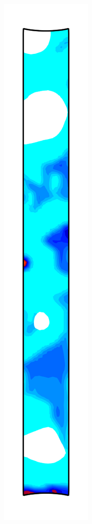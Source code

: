 \begin{figure}[!htb]
\begin{subfigure}{0.08\textwidth}
  \end{subfigure}
  \begin{subfigure}{0.08\textwidth}
    \centering
    \includegraphics[width=\textwidth]{Chapter5/figures/spallation/c_9}

\end{subfigure}
\end{figure}
